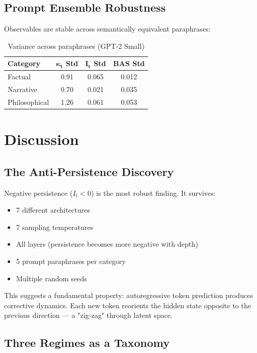 \documentclass[12pt,a4paper]{article}
\begin{document}
\subsection{Prompt Ensemble Robustness}

Observables are stable across semantically equivalent paraphrases:

\begin{table}[h]
\centering
\caption{Variance across paraphrases (GPT-2 Small)}
\begin{tabular}{lccc}
\toprule
\textbf{Category} & $\mathbf{\kappa_t}$ Std & $\mathbf{I_t}$ Std & \textbf{BAS Std} \\
\midrule
Factual & 0.91 & 0.065 & 0.012 \\
Narrative & 0.70 & 0.021 & 0.035 \\
Philosophical & 1.26 & 0.061 & 0.053 \\
\bottomrule
\end{tabular}
\end{table}

\section{Discussion}

\subsection{The Anti-Persistence Discovery}

Negative persistence ($I_t < 0$) is the most robust finding. It survives:
\begin{itemize}[noitemsep]
    \item 7 different architectures
    \item 7 sampling temperatures
    \item All layers (persistence becomes more negative with depth)
    \item 5 prompt paraphrases per category
    \item Multiple random seeds
\end{itemize}

This suggests a fundamental property: autoregressive token prediction produces corrective dynamics. Each new token reorients the hidden state opposite to the previous direction — a "zig-zag" through latent space.

\subsection{Three Regimes as a Taxonomy}
\end{document}
